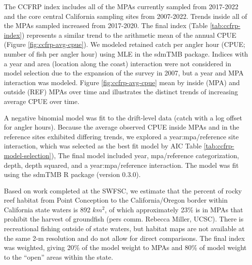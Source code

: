 \documentclass[11pt,
  letterpaper,
]{article}
\begin{document}
The CCFRP index includes all of the MPAs currently sampled from 2017-2022 and the core central California sampling sites from 2007-2022. Trends inside all of the MPAs sampled increased from 2017-2020. The final index (Table \ref{tab:ccfrp-index}) represents a similar trend to the arithmetic mean of the annual CPUE (Figure \ref{fig:ccfrp-avg-cpue}). We modeled retained catch per angler hour (CPUE; number of fish per angler hour) using MLE in the sdmTMB package. Indices with a year and area (location along the coast) interaction were not considered in model selection due to the expansion of the survey in 2007, but a year and MPA interaction was modeled. Figure \ref{fig:ccfrp-avg-cpue} mean by inside (MPA) and outside (REF) MPAs over time and illustrates the distinct trends of increasing average CPUE over time.

A negative binomial model was fit to the drift-level data (catch with a log offset for angler hours). Because the average observed CPUE inside MPAs and in the reference sites exhibited differing trends, we explored a year:mpa/reference site interaction, which was selected as the best fit model by AIC Table \ref{tab:ccfrp-model-selection}), The final model included year, mpa/reference categorization, depth, depth squared, and a year:mpa/reference interaction. The model was fit using the sdmTMB R package (version 0.3.0).

Based on work completed at the SWFSC, we estimate that the percent of rocky reef habitat from Point Conception to the California/Oregon border within California state waters is 892 \(km^2\), of which approximately 23\% is in MPAs that prohibit the harvest of groundfish (pers comm. Rebecca Miller, UCSC). There is recreational fishing outside of state waters, but habitat maps are not available at the same 2-m resolution and do not allow for direct comparisons. The final index was weighted, giving 20\% of the model weight to MPAs and 80\% of model weight to the ``open'' areas within the state.

\begingroup\fontsize{7}{9}\selectfont
\end{document}
